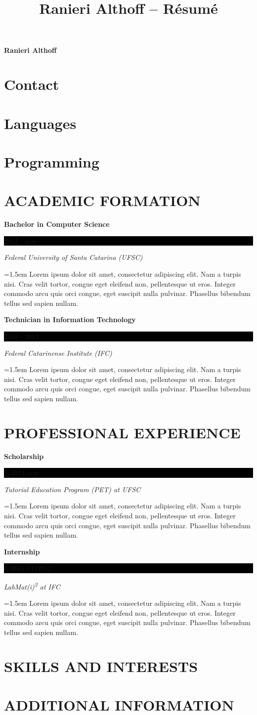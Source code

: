 \documentclass{article}
\newcommand{\sectiontitle}[1]{\section*{\uppercase{#1}}}
\newcommand{\formationentry}[4]{
	\noindent \textbf{#1} \hfill
	\colorbox{black}{
		\parbox[c][1em]{8em}{
			\hfill \color{white} #2
		}
	} \par
	\noindent \textit{#3} \par
	\noindent \hangindent=1.5em \hangafter=0 \small #4 \par
	\normalsize
	\vspace{1em}
}
\newcommand{\experienceentry}[4]{
	\noindent \textbf{#1} \hfill
	\colorbox{black}{
		\parbox[c][1em]{8em}{
			\hfill \color{white} #2
		}
	} \par
	\noindent \textit{#3} \par
	\noindent \hangindent=1.5em \hangafter=0 \small #4 \par
	\normalsize
	\vspace{1em}
}
\newenvironment{aside}{
\begin{minipage}[t]{0.3\textwidth}
}{
\end{minipage}
}
\newenvironment{main}{
\begin{minipage}[t]{0.7\textwidth}
}{
\end{minipage}
}
\begin{document}
 \selectfont

\title{Ranieri Althoff -- Résumé}

\Huge \hfill \textbf{Ranieri Althoff}
\normalsize \par
{}

\begin{aside}
\section*{Contact}


\section*{Languages}


\section*{Programming}


\end{aside}
\begin{main}
\sectiontitle{Academic Formation}
\formationentry{Bachelor in Computer Science}{2013 - now}{Federal University
of Santa Catarina (UFSC)}{Lorem ipsum dolor sit amet, consectetur adipiscing
elit. Nam a turpis nisi. Cras velit tortor, congue eget eleifend non,
pellentesque ut eros.  Integer commodo arcu quis orci congue, eget suscipit
nulla pulvinar. Phasellus bibendum tellus sed sapien nullam.}

\formationentry{Technician in Information Technology}{2010 - 2012}{Federal
Catarinense Institute (IFC)}{Lorem ipsum dolor sit amet, consectetur adipiscing
elit. Nam a turpis nisi. Cras velit tortor, congue eget eleifend non,
pellentesque ut eros.  Integer commodo arcu quis orci congue, eget suscipit
nulla pulvinar. Phasellus bibendum tellus sed sapien nullam.}


\sectiontitle{Professional Experience}
\experienceentry{Scholarship}{4/2014-now}{Tutorial Education Program (PET) at
UFSC}{Lorem ipsum dolor sit amet, consectetur adipiscing elit. Nam a turpis
nisi. Cras velit tortor, congue eget eleifend non, pellentesque ut eros.
Integer commodo arcu quis orci congue, eget suscipit nulla pulvinar.
Phasellus bibendum tellus sed sapien nullam.}

\experienceentry{Internship}{6/2011-11/2012}{LabMat(i)\textsuperscript{2} at
IFC}{Lorem ipsum dolor sit amet, consectetur adipiscing elit. Nam a turpis
nisi. Cras velit tortor, congue eget eleifend non, pellentesque ut eros.
Integer commodo arcu quis orci congue, eget suscipit nulla pulvinar.
Phasellus bibendum tellus sed sapien nullam.}


\sectiontitle{Skills and Interests}


\sectiontitle{Additional Information}


\end{main}
\end{document}
